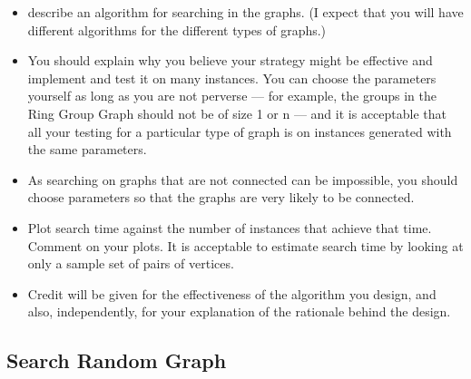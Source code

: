\documentclass[11pt,a4paper,notitlepage]{article}
\begin{document}
\begin{itemize}
    \item describe an algorithm for searching in the graphs. (I expect that you will have different algorithms for the different types of graphs.) 
    \item You should explain why you believe your strategy might be effective and implement and test it on many instances. You can choose the parameters yourself as long as you are not perverse — for example, the groups in the Ring Group Graph should not be of size 1 or n — and it is acceptable that all your testing for a particular type of graph is on instances generated with the same parameters. 
    \item As searching on graphs that are not connected can be impossible, you should choose parameters so that the graphs are very likely to be connected. 
    \item Plot search time against the number of instances that achieve that time. Comment on your plots. It is acceptable to estimate search time by looking at only a sample set of pairs of vertices. 
    \item Credit will be given for the effectiveness of the algorithm you design, and also, independently, for your explanation of the rationale behind the design.
\end{itemize}

\subsection*{Search Random Graph}
\end{document}
